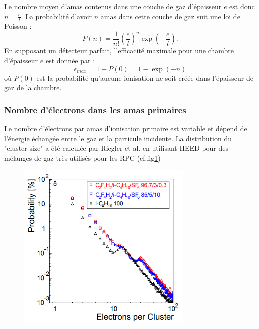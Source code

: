 Le nombre moyen d'amas contenus dans une couche de gaz d'épaisseur $e$ est donc $\bar{n}=\frac{e}{l}$. La probabilité d'avoir $n$ amas dans cette couche de gaz suit une loi de Poisson :
\begin{equation}
P(n)=\frac{1}{n!}\left(\frac{e}{l}\right)^{n}\exp\left(-\frac{e}{l}\right).
\end{equation}
En supposant un détecteur parfait, l'efficacité maximale pour une chambre d'épaisseur $e$ est donnée par :
\begin{equation}
\epsilon_{max}=1-P(0)=1-\exp\left(-\bar{n}\right)
\end{equation}
où $P(0)$ est la probabilité qu'aucune ionisation ne soit créée dans l'épaisseur de gaz de la chambre.

\subsubsection{Nombre d'électrons dans les amas primaires}
Le nombre d'électrons par amas d'ionisation primaire est variable et dépend de l'énergie échangée entre le gaz et la particule incidente. La distribution du "cluster size" a été calculée par Riegler et al. \cite{Riegler:570462} en utilisant HEED pour des mélanges de gaz très utilisés pour les RPC (cf.fig\ref{cluster})
\begin{figure}[h!]
	\centering
	\includegraphics[width=0.75\textwidth]{RPC/cluster.png}
	\label{cluster}
\end{figure}


